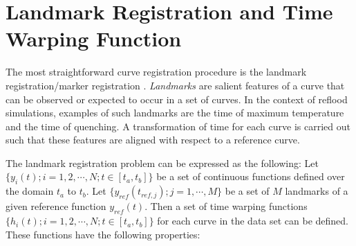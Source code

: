 \section{Landmark Registration and Time Warping Function}\label{app:landmark_registration}

The most straightforward curve registration procedure is the landmark registration/marker registration \cite{Ramsay2009}.
\emph{Landmarks} are salient features of a curve that can be observed or expected to occur in a set of curves.
In the context of reflood simulations, examples of such landmarks are the time of maximum temperature and the time of quenching.
A transformation of time for each curve is carried out such that these features are aligned with respect to a reference curve.

The landmark registration problem can be expressed as the following: 
Let $\{y_i(t); i = 1, 2, \cdots, N; t \in [t_a,t_b]\}$ be a set of continuous functions defined over the domain $t_a$ to $t_b$.
Let $\{y_{ref}(t_{ref,j}); j = 1, \cdots, M\}$ be a set of $M$ landmarks of a given reference function $y_{ref}(t)$.
Then a set of time warping functions $\{h_i(t); i = 1, 2, \cdots, N; t \in [t_a, t_b]\}$ for each curve in the data set can be defined.
These functions have the following properties:

